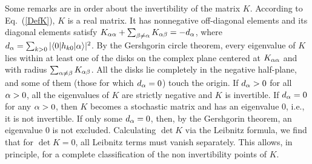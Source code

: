 \documentclass[aps,pra,letterpaper,twocolumn,showpacs,superscriptaddress,floatfix,longbibliography]{revtex4-1}
\begin{document}
Some remarks are in order about the invertibility of the matrix $K$.
According to Eq.~(\ref{DefK}), $K$ is a real matrix. It has
nonnegative off-diagonal elements and its diagonal elements satisfy
$K_{\alpha\alpha}+ \sum_{\beta \neq \alpha} K_{\alpha\beta} = -d_\alpha$, where
$d_\alpha=\sum_{k>0} |\langle{0}| h_{k0}|{\alpha}\rangle|^2$.  By the Gershgorin
circle theorem, every eigenvalue of $K$ lies within at least one of
the disks on the complex plane centered at $K_{\alpha\alpha}$ and with
radius $\sum_{\alpha \neq \beta} K_{\alpha\beta}$. All the disks lie completely
in the negative half-plane, and some of them (those for which $d_\alpha
=0$) touch the origin.  If $d_\alpha >0$ for all $\alpha>0$, all the
eigenvalues of $K$ are strictly negative and $K$ is invertible. If
$d_\alpha=0$ for any $\alpha>0$, then $K$ becomes a stochastic matrix and
has an eigenvalue $0$, i.e., it is not invertible. If only some
$d_\alpha=0$, then, by the Gershgorin theorem, an eigenvalue $0$ is not
excluded. Calculating $\det K$ via the Leibnitz formula, we find that
for $\det K=0$, all Leibnitz terms must vanish separately. This
allows, in principle, for a complete classification of the non
invertibility points of $K$.













\end{document}
